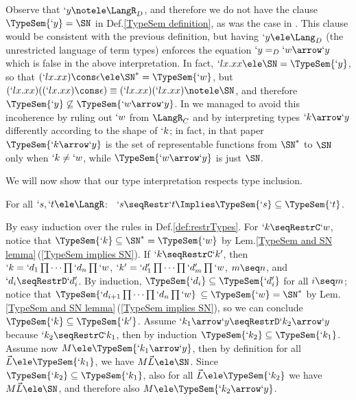 \documentclass{lmcs}
\newcommand{\vect}[1]{\vec{#1}}
\begin{document}
Observe that $`y\notele \LangR_D$, and therefore we do not have the clause $\TypeSem{`y} = \SN$ in Def.\skp\ref{TypeSem definition}, as was the case in \cite{BakBdL-ITRS12}. 
This clause would be consistent with the previous definition, but having $`y \ele \Lang_D$ (the unrestricted language of term types) enforces the equation $`y =_D `w\arrow `y$ which is false in the above interpretation.
In fact, $`l x.xx \ele \SN = \TypeSem{`y}$, so that $(`l x.xx)\cons \epsilon \ele \SN^* = \TypeSem{`w}$, but $(`l x.xx)((`l x.xx)\cons \epsilon) \equiv (`l x.xx)(`l x.xx) \notele \SN$, and therefore $\TypeSem{`y}\not\subseteq \TypeSem{`w\arrow `y}$. 
In \cite{BakBdL-ITRS12} we managed to avoid this incoherence by ruling out $`w$ from $\LangR_C$ and by interpreting types $`k\arrow `y$ differently according to the shape of $`k$; in fact, in that paper $\TypeSem{`k\arrow `y}$ is the set of representable functions from $\SN^*$ to $\SN$ only when $`k \neq`w$, while $\TypeSem{`w\arrow `y}$ is just $\SN$.

We will now show that our type interpretation respects type inclusion.

 \begin{lem} \label{closed for leq}
For all $`s, `t \ele \LangR $:~
$`s \seqRestr `t \Implies \TypeSem{`s} \subseteq \TypeSem{`t}$.
 \end{lem}

 \begin{Proof}
By easy induction over the rules in Def.\skp\ref{def:restrTypes}.
For $`k \seqRestrC `w$, notice that $\TypeSem{`k } \subseteq \SN^*= \TypeSem{`w}$ by Lem.\skp\ref{TypeSem and SN lemma}\,(\ref{TypeSem implies SN}). If $`k\seqRestrC `k'$, then $`k = `d_1\prod \cdots\prod `d_n\prod `w$, $`k' = `d'_1\prod \cdots\prod `d'_m\prod `w$, $m \seq n$, and $`d_i\seqRestrD`d'_i$.
By induction, $\TypeSem{`d_i} \subseteq \TypeSem{`d'_i}$ for all $i\seq m$; notice that $\TypeSem{`d_{i+1}\prod \cdots\prod `d_n\prod `w}$ $\subseteq \TypeSem{`w} =\SN^*$ by Lem.\skp\ref{TypeSem and SN lemma}\,(\ref{TypeSem implies SN}), so we can conclude $\TypeSem{`k }\subseteq\TypeSem{`k' }$.
Assume $`k _1\arrow `y \seqRestrD `k _2\arrow `y$ because $`k _2 \seqRestrC `k _1$, then by induction $\TypeSem{`k_2}\subseteq\TypeSem{`k_1}$.
Assume now $M \ele \TypeSem{`k _1\arrow `y}$, then by definition for all $\vect{L} \ele \TypeSem{`k_1}$, we have $M\vect{L} \ele \SN$. 
Since $ \TypeSem{`k_2} \subseteq\TypeSem{`k_1}$, also for all $\vect{L} \ele \TypeSem{`k_2}$ we have $M\vect{L} \ele \SN$, and therefore also $M \ele \TypeSem{`k _2\arrow `y}$.
 \end{Proof}
\end{document}
